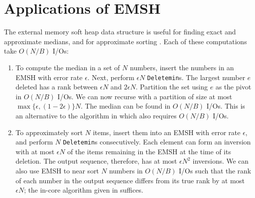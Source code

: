 \section{Applications of EMSH}
\label{appl:emsh} 
The external memory soft heap data structure is useful for finding exact and 
	approximate medians, and for approximate sorting \cite{Ch00a}.
Each of these computations take $O(N/B)$ I/Os:
\begin{enumerate}
\item To compute the median in a set of $N$ numbers, insert the numbers
        in an EMSH with error rate $\epsilon$.
Next, perform $\epsilon N$ {\tt Deletemin}s. The largest number $e$ deleted
        has a rank between $\epsilon N$ and $2\epsilon N$.
Partition the set using $e$ as the pivot in $O(N/B)$ I/Os.
We can now recurse with a partition of size at most $\max\{\epsilon, (1-2\epsilon)\}N$.
The median can be found in $O(N/B)$ I/Os.
This is an alternative to the algorithm in \cite{Si02} which also requires $O(N/B)$ I/Os.
\item To approximately sort $N$ items, insert them into an EMSH with error rate $\epsilon$, and
        perform $N$ {\tt Deletemin}s consecutively. Each element can form an inversion with
        at most $\epsilon N$ of the items remaining in the EMSH at the time of its deletion.
        The output sequence, therefore, has at most $\epsilon N^2$ inversions.
We can also use EMSH to near sort $N$ numbers in $O(N/B)$ I/Os such that
        the rank of each number in the output sequence differs from
        its true rank by at most $\epsilon N$; the in-core algorithm given in \cite{Ch00a} suffices.
\end{enumerate}

